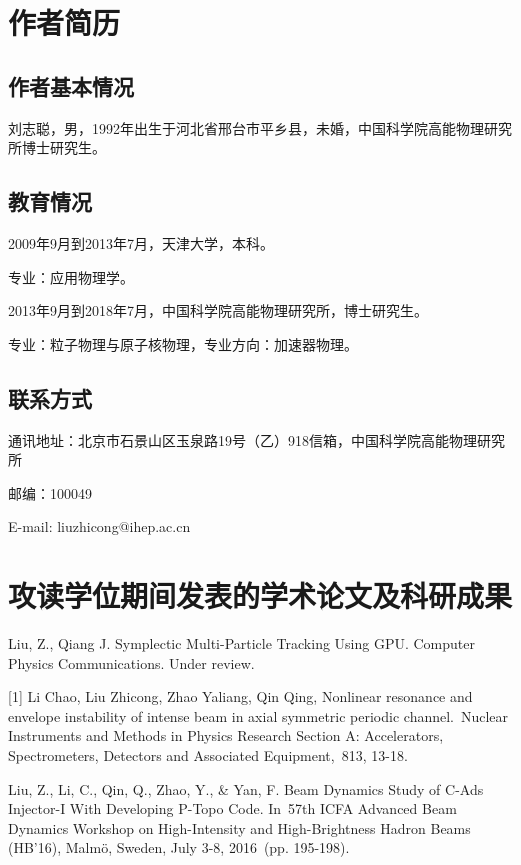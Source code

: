 \chapter{作者简历}

\section*{作者基本情况}

刘志聪，男，1992年出生于河北省邢台市平乡县，未婚，中国科学院高能物理研究所博士研究生。

\section*{教育情况}

2009年9月到2013年7月，天津大学，本科。

专业：应用物理学。

2013年9月到2018年7月，中国科学院高能物理研究所，博士研究生。

专业：粒子物理与原子核物理，专业方向：加速器物理。

\section*{联系方式}

通讯地址：北京市石景山区玉泉路19号（乙）918信箱，中国科学院高能物理研究所

邮编：100049

E-mail: liuzhicong@ihep.ac.cn

\chapter{攻读学位期间发表的学术论文及科研成果}

Liu, Z., Qiang J. Symplectic Multi-Particle Tracking Using GPU. Computer Physics Communications. Under review.

[1] Li Chao, Liu Zhicong, Zhao Yaliang, Qin Qing, Nonlinear resonance and envelope instability of intense beam in axial symmetric periodic channel. Nuclear Instruments and Methods in Physics Research Section A: Accelerators, Spectrometers, Detectors and Associated Equipment, 813, 13-18.

Liu, Z., Li, C., Qin, Q., Zhao, Y., \& Yan, F. Beam Dynamics Study of C-Ads Injector-I With Developing P-Topo Code. In 57th ICFA Advanced Beam Dynamics Workshop on High-Intensity and High-Brightness Hadron Beams (HB'16), Malmö, Sweden, July 3-8, 2016 (pp. 195-198).


